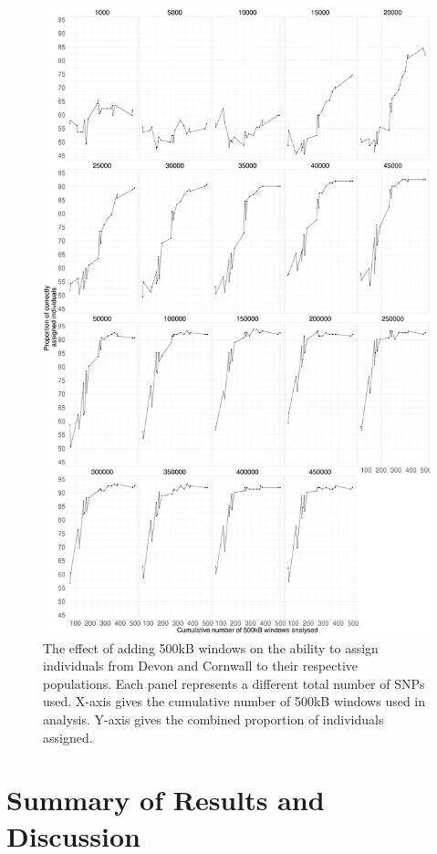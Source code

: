 {\begin{figure}[htp]
    \centering
    \includegraphics[width=1.0\textwidth]{../images/chapter1/cumulative_windows_val.pdf}
    \caption{The effect of adding 500kB windows on the ability to assign individuals from Devon and Cornwall to their respective populations. Each panel represents a different total number of SNPs used. X-axis gives the cumulative number of 500kB windows used in analysis. Y-axis gives the combined proportion of individuals assigned.}
    \label{fig:cumulative_windows_val}
\end{figure}


\section{Summary of Results and Discussion}

}
